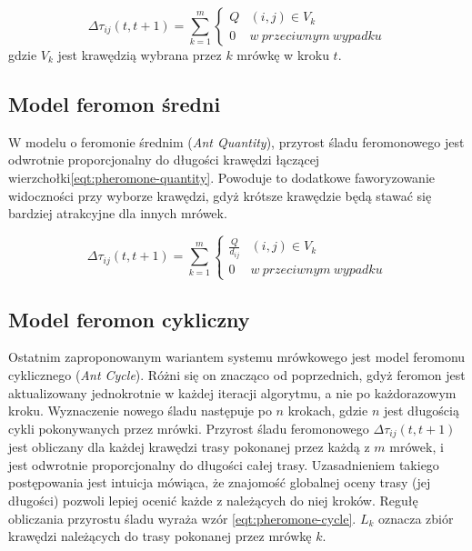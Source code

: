 {{{            \begin{equation}\label{eqt:pheromone-density}
                \Delta\tau_{ij}(t, t + 1) = \sum_{k=1}^m \left\{
                        \begin{matrix}
                            Q & (i, j) \in V_k\\
                            0 & w\ przeciwnym\ wypadku
                        \end{matrix}
                    \right.
            \end{equation}
            gdzie $V_k$ jest krawędzią wybrana przez $k$ mrówkę w kroku $t$.
        }

        \subsection{Model feromon średni}
        {
            W modelu o feromonie średnim (\textit{Ant Quantity}), przyrost śladu feromonowego jest odwrotnie
            proporcjonalny do długości krawędzi łączącej wierzchołki\ref{eqt:pheromone-quantity}. Powoduje to dodatkowe
            faworyzowanie widoczności przy wyborze krawędzi, gdyż krótsze krawędzie będą stawać się bardziej atrakcyjne
            dla innych mrówek.

            \begin{equation}\label{eqt:pheromone-quantity}
                \Delta\tau_{ij}(t, t + 1) = \sum_{k=1}^m \left\{
                        \begin{matrix}
                            \frac{Q}{d_{ij}} & (i, j) \in V_k\\
                            0 & w\ przeciwnym\ wypadku
                        \end{matrix}
                    \right.
            \end{equation}
        }

        \subsection{Model feromon cykliczny}
        {
            Ostatnim zaproponowanym wariantem systemu mrówkowego jest model feromonu cyklicznego (\textit{Ant Cycle}).
            Różni się on znacząco od poprzednich, gdyż feromon jest aktualizowany jednokrotnie w każdej iteracji
            algorytmu, a nie po każdorazowym kroku. Wyznaczenie nowego śladu następuje po $n$ krokach, gdzie $n$ jest
            długością cykli pokonywanych przez mrówki. Przyrost śladu feromonowego $\Delta\tau_{ij}(t, t + 1)$ jest
            obliczany dla każdej krawędzi trasy pokonanej przez każdą z $m$ mrówek, i jest odwrotnie proporcjonalny do
            długości całej trasy. Uzasadnieniem takiego postępowania jest intuicja mówiąca, że znajomość globalnej oceny
            trasy (jej długości) pozwoli lepiej ocenić każde z należących do niej kroków. Regułę obliczania przyrostu
            śladu wyraża wzór \ref{eqt:pheromone-cycle}. $L_k$ oznacza zbiór krawędzi należących do trasy pokonanej
            przez mrówkę $k$.

}}}
